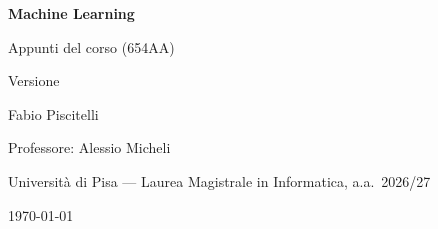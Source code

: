 \documentclass[11pt,a4paper,oneside,openany]{book}
\begin{document}
\hypersetup{pageanchor=false}
\begin{titlepage}
\centering
\vspace*{3cm}
{\Huge\bfseries\color{inkblue} Machine Learning\par}
\vspace{0.6cm}
{\Large\color{accentblue} Appunti del corso (654AA)\par}
\vspace{0.3cm}
{\large\color{gray!70!black} Versione \docversion\par}
\vspace{2.2cm}
{\large Fabio Piscitelli\par}
\vspace{0.4cm}
{\normalsize Professore: Alessio Micheli\par}
{\normalsize Università di Pisa --- Laurea Magistrale in Informatica, a.a.\ 2026/27\par}
\vfill
{\normalsize \today\par}
\end{titlepage}

\frontmatter
\hypersetup{pageanchor=true}
\tableofcontents

\mainmatter


























\end{document}
